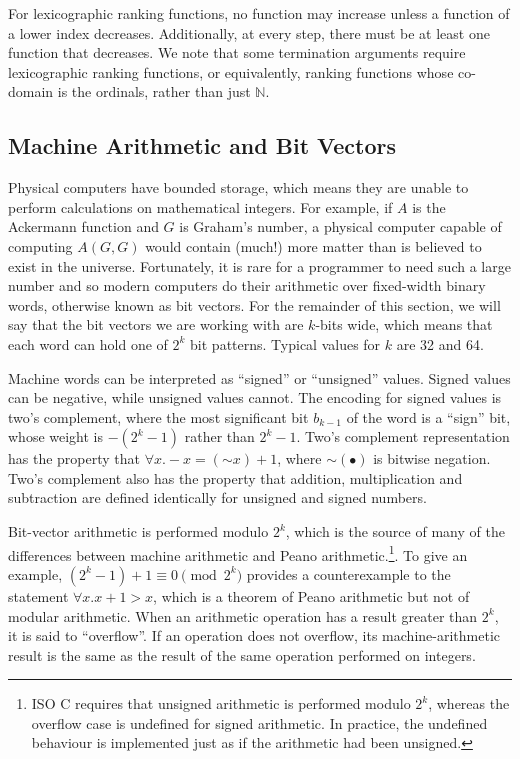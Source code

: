 \documentclass[preprint]{sigplanconf}
\theoremstyle{definition}
\begin{document}
For lexicographic ranking functions, no function may increase unless a function of a lower index decreases.
Additionally, at every step, there must be at least one function that decreases.
We note that some termination arguments require lexicographic ranking functions, or equivalently, ranking functions
whose co-domain is the ordinals, rather than just $\mathbb{N}$.


\subsection{Machine Arithmetic and Bit Vectors} \label{sec:machine.arith} 

Physical computers have bounded storage, which means they are unable to
perform calculations on mathematical integers.  For example, if $A$ is the
Ackermann function and $G$ is Graham's number, a physical computer capable
of computing $A(G, G)$ would contain (much!) more matter than is believed to
exist in the universe.  Fortunately, it is rare for a programmer to need
such a large number and so modern computers do their arithmetic over
fixed-width binary words, otherwise known as bit vectors.  For the remainder
of this section, we will say that the bit vectors we are working with are
$k$-bits wide, which means that each word can hold one of $2^k$ bit
patterns.  Typical values for $k$ are 32 and 64.

Machine words can be interpreted as ``signed'' or ``unsigned'' values. 
Signed values can be negative, while unsigned values cannot.  The encoding
for signed values is two's complement, where the most significant bit
$b_{k-1}$ of the word is a ``sign'' bit, whose weight is $-(2^k - 1)$ rather
than $2^k - 1$.  Two's complement representation has the property that
$\forall x .  -x = (\mathord{\sim} x) + 1$, where $\mathord{\sim}(\bullet)$
is bitwise negation.  Two's complement also has the property that addition,
multiplication and subtraction are defined identically for unsigned and
signed numbers.

Bit-vector arithmetic is performed modulo $2^k$, which is the source of many
of the differences between machine arithmetic and Peano
arithmetic.\footnote{ISO C requires that unsigned arithmetic is performed
modulo $2^k$, whereas the overflow case is undefined for signed arithmetic. 
In practice, the undefined behaviour is implemented just as if the
arithmetic had been unsigned.}.  To give an example, $(2^k - 1) + 1 \equiv 0
\pmod {2^k}$ provides a counterexample to the statement $\forall x. 
x + 1 > x$, which is a theorem of Peano arithmetic but not of modular
arithmetic.  When an arithmetic operation has a result greater than $2^k$,
it is said to ``overflow''.  If an operation does not overflow, its
machine-arithmetic result is the same as the result of the same operation
performed on integers.
\end{document}
